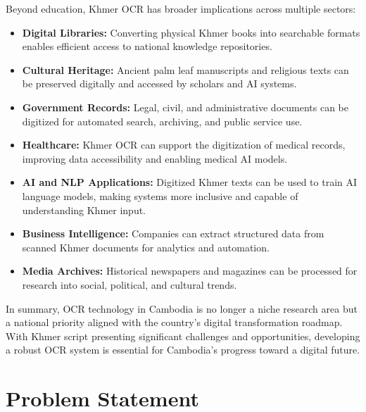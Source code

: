 Beyond education, Khmer OCR has broader implications across multiple sectors:

\begin{itemize}
    \item \textbf{Digital Libraries:} Converting physical Khmer books into searchable formats enables efficient access to national knowledge repositories.
    
    \item \textbf{Cultural Heritage:} Ancient palm leaf manuscripts and religious texts can be preserved digitally and accessed by scholars and AI systems.
    
    \item \textbf{Government Records:} Legal, civil, and administrative documents can be digitized for automated search, archiving, and public service use.
    
    \item \textbf{Healthcare:} Khmer OCR can support the digitization of medical records, improving data accessibility and enabling medical AI models.
    
    \item \textbf{AI and NLP Applications:} Digitized Khmer texts can be used to train AI language models, making systems more inclusive and capable of understanding Khmer input.
    
    \item \textbf{Business Intelligence:} Companies can extract structured data from scanned Khmer documents for analytics and automation.
    
    \item \textbf{Media Archives:} Historical newspapers and magazines can be processed for research into social, political, and cultural trends.
\end{itemize}

In summary, OCR technology in Cambodia is no longer a niche research area but a national priority aligned with the country’s digital transformation roadmap. With Khmer script presenting significant challenges and opportunities, developing a robust OCR system is essential for Cambodia’s progress toward a digital future.



\section{Problem Statement}
\label{sec:problem}

